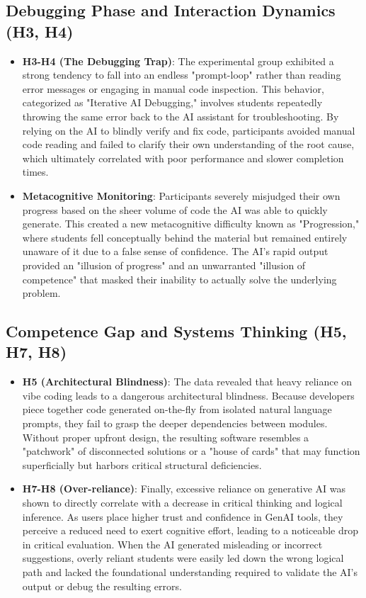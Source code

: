 \documentclass[../tanulmany.tex]{subfiles}
\begin{document}
\subsection{Debugging Phase and Interaction Dynamics (H3, H4)}
\begin{itemize}
    \item \textbf{H3-H4 (The Debugging Trap)}: The experimental group exhibited a strong tendency to fall into an endless "prompt-loop" 
    rather than reading error messages or engaging in manual code inspection. This behavior, categorized as "Iterative AI Debugging," 
    involves students repeatedly throwing the same error back to the AI assistant for troubleshooting. By relying on the AI to blindly 
    verify and fix code, participants avoided manual code reading and failed to clarify their own understanding of the root cause, which 
    ultimately correlated with poor performance and slower completion times. \cite{shen2026how}
    \item \textbf{Metacognitive Monitoring}: Participants severely misjudged their own progress based on the sheer volume of code the 
    AI was able to quickly generate. This created a new metacognitive difficulty known as "Progression," where students fell conceptually 
    behind the material but remained entirely unaware of it due to a false sense of confidence. The AI's rapid output provided an 
    "illusion of progress" and an unwarranted "illusion of competence" that masked their inability to actually solve the underlying 
    problem. \cite{prather2024widening}
\end{itemize}

\subsection{Competence Gap and Systems Thinking (H5, H7, H8)}
\begin{itemize}
    \item \textbf{H5 (Architectural Blindness)}: The data revealed that heavy reliance on vibe coding leads to a dangerous architectural blindness. Because developers piece 
    together code generated on-the-fly from isolated natural language prompts, they fail to grasp the deeper dependencies between modules. Without proper upfront design, the 
    resulting software resembles a "patchwork" of disconnected solutions or a "house of cards" that may function superficially but harbors critical structural deficiencies. \cite{maes2025gotchas} \cite{}
    \item \textbf{H7-H8 (Over-reliance)}: Finally, excessive reliance on generative AI was shown to directly correlate with a decrease in critical thinking and logical 
    inference. As users place higher trust and confidence in GenAI tools, they perceive a reduced need to exert cognitive effort, leading to a noticeable drop in critical 
    evaluation. When the AI generated misleading or incorrect suggestions, overly reliant students were easily led down the wrong logical path and lacked the foundational 
    understanding required to validate the AI's output or debug the resulting errors. \cite{lee2025impact} \cite{shen2026how} \cite{prather2024widening}
\end{itemize}
\end{document}
